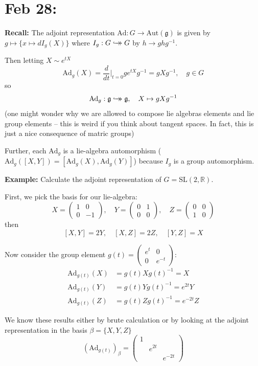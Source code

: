 \documentclass[12pt]{article}
\newcommand{\R}{\mathbb{R}}
\newcommand{\SL}{\text{SL}}
\newcommand{\biject}{\hookrightarrow \hspace{-8pt} \rightarrow}
\newcommand{\g}{\mathfrak{g}}
\newcommand{\Aut}{\text{Aut}}
\begin{document}
\section{Feb 28:}
    \textbf{Recall:} The adjoint representation $\text{Ad}: G \to \Aut(\g)$ is given by $g \mapsto \{x \mapsto dI_g(X)\}$ where $I_g: G \biject G$ by $h \to ghg^{-1}$. 

    Then letting $X \sim e^{tX}$ 
    \[\text{Ad}_g(X) = \frac{d}{dt}\bigg\vert_{t=0} ge^{tX}g^{-1} = gXg^{-1}, \quad g \in G\]
    so 
    \[\text{Ad}_g: \g \biject \g, \quad X \mapsto gXg^{-1}\]
    (one might wonder why we are allowed to compose lie algebras elements and lie group elements -- this is weird if you think about tangent spaces. In fact, this is just a nice consequence of matric groups)

    Further, each $\text{Ad}_g$ is a lie-algebra automorphism ($\text{Ad}_g([X, Y]) = [\text{Ad}_g(X), \text{Ad}_g(Y)]$) because $I_g$ is a group automorphism. 

    \textbf{Example:} Calculate the adjoint representation of $G = \SL(2, \R)$. 

    First, we pick the basis for our lie-algebra: 
    \[X = \begin{pmatrix}
        1 & 0\\ 
        0 & -1
    \end{pmatrix}, \quad Y = \begin{pmatrix}
        0 & 1\\ 
        0 & 0
    \end{pmatrix}, \quad Z = \begin{pmatrix}
        0 & 0\\ 
        1 & 0
    \end{pmatrix}\]
    then 
    \[[X, Y] = 2Y, \quad [X, Z] = 2Z, \quad [Y, Z] = X\]

    Now consider the group element $g(t) = \begin{pmatrix}
        e^t & 0\\ 
        0 & e^{-t}
    \end{pmatrix}$: 
    \begin{align*}
        \text{Ad}_{g(t)}(X) &= g(t) X g(t)^{-1} = X\\
        \text{Ad}_{g(t)}(Y) &= g(t) Y g(t)^{-1} = e^{2t}Y\\
        \text{Ad}_{g(t)}(Z) &= g(t) Z g(t)^{-1} = e^{-2t}Z
    \end{align*}

    We know these results either by brute calculation or by looking at the adjoint representation in the basis $\beta = \{X, Y, Z\}$ 
    \[(\text{Ad}_{g(t)})_{\beta} = \begin{pmatrix}
        1\\ 
        & e^{2t}\\ 
        & & e^{-2t}
    \end{pmatrix}\]
\end{document}
